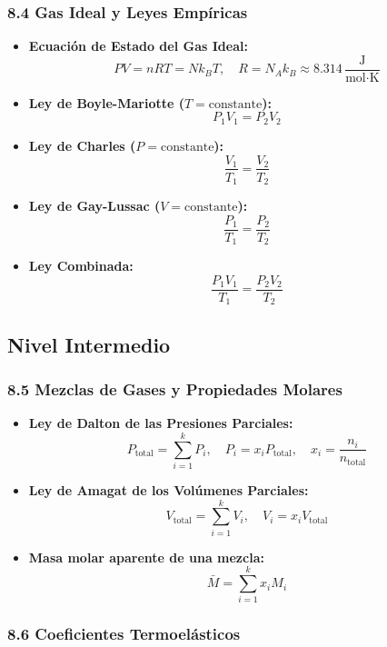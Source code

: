 \documentclass[11pt,a4paper]{article}
\begin{document}
\subsubsection*{8.4 Gas Ideal y Leyes Empíricas}

\begin{itemize}
  \item \textbf{Ecuación de Estado del Gas Ideal:}
  \[
    P V = n R T = N k_B T, \quad R = N_A k_B \approx 8.314 \, \frac{\text{J}}{\text{mol}\cdot\text{K}}
  \]
  \item \textbf{Ley de Boyle-Mariotte ($T = \text{constante}$):}
  \[
    P_1 V_1 = P_2 V_2
  \]
  \item \textbf{Ley de Charles ($P = \text{constante}$):}
  \[
    \frac{V_1}{T_1} = \frac{V_2}{T_2}
  \]
  \item \textbf{Ley de Gay-Lussac ($V = \text{constante}$):}
  \[
    \frac{P_1}{T_1} = \frac{P_2}{T_2}
  \]
  \item \textbf{Ley Combinada:}
  \[
    \frac{P_1 V_1}{T_1} = \frac{P_2 V_2}{T_2}
  \]
\end{itemize}

\subsection*{Nivel Intermedio}

\subsubsection*{8.5 Mezclas de Gases y Propiedades Molares}

\begin{itemize}
  \item \textbf{Ley de Dalton de las Presiones Parciales:}
  \[
    P_{\text{total}} = \sum_{i=1}^k P_i, \quad P_i = x_i P_{\text{total}}, \quad x_i = \frac{n_i}{n_{\text{total}}}
  \]
  \item \textbf{Ley de Amagat de los Volúmenes Parciales:}
  \[
    V_{\text{total}} = \sum_{i=1}^k V_i, \quad V_i = x_i V_{\text{total}}
  \]
  \item \textbf{Masa molar aparente de una mezcla:}
  \[
    \bar{M} = \sum_{i=1}^k x_i M_i
  \]
\end{itemize}

\subsubsection*{8.6 Coeficientes Termoelásticos}
\end{document}
